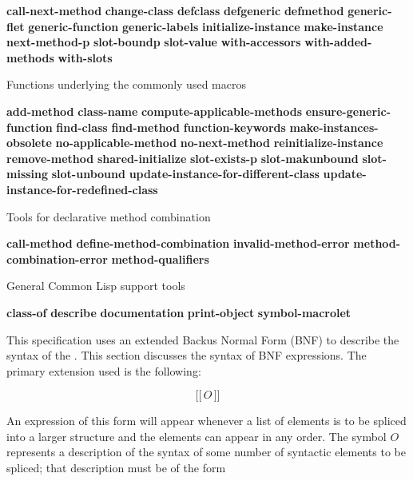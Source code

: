 {\bf call-next-method}\hfil\break
{\bf change-class}\hfil\break
{\bf defclass}\hfil\break
{\bf defgeneric}\hfil\break
{\bf defmethod}\hfil\break
{\bf generic-flet}\hfil\break
{\bf generic-function}\hfil\break
{\bf generic-labels}\hfil\break
{\bf initialize-instance}\hfil\break
{\bf make-instance}\hfil\break
{\bf next-method-p}\hfil\break
{\bf slot-boundp}\hfil\break
{\bf slot-value}\hfil\break
{\bf with-accessors}\hfil\break
{\bf with-added-methods}\hfil\break
{\bf with-slots}


\item{\bull}
{Functions underlying the commonly used macros}

{\bf add-method}\hfil\break
{\bf class-name}\hfil\break
{\bf compute-applicable-methods}\hfil\break
{\bf ensure-generic-function}\hfil\break
{\bf find-class}\hfil\break
{\bf find-method}\hfil\break
{\bf function-keywords}\hfil\break
{\bf make-instances-obsolete}\hfil\break
{\bf no-applicable-method}\hfil\break
{\bf no-next-method}\hfil\break
{\bf reinitialize-instance}\hfil\break
{\bf remove-method}\hfil\break
{\bf shared-initialize}\hfil\break
{\bf slot-exists-p}\hfil\break
{\bf slot-makunbound}\hfil\break
{\bf slot-missing}\hfil\break
{\bf slot-unbound}\hfil\break
{\bf update-instance-for-different-class}\hfil\break
{\bf update-instance-for-redefined-class}

\item{\bull}
{Tools for declarative method combination}

{\bf call-method}\hfil\break
{\bf define-method-combination}\hfil\break
{\bf invalid-method-error}\hfil\break 
{\bf method-combination-error}\hfil\break
{\bf method-qualifiers}

\item{\bull}
{General Common Lisp support tools}

{\bf class-of}\hfil\break
{\bf describe}\hfil\break
{\bf documentation}\hfil\break
{\bf print-object}\hfil\break 
{\bf symbol-macrolet}

\endlist

\vfill
\endSection%


This specification uses an extended Backus Normal Form (BNF) to
describe the syntax of the \OS.  This section discusses the syntax of
BNF expressions.  The primary extension used is the following:

$$\lbrack\!\lbrack\, O\,\rbrack\!\rbrack$$

An expression of this form will appear whenever a list of elements is
to be spliced into a larger structure and the elements can appear in
any order. The symbol $O$ represents a description of the syntax of
some number of syntactic elements to be spliced; that description must
be of the form

